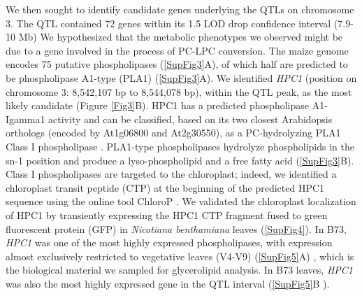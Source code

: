 \documentclass[9pt,twocolumn,twoside,lineno]{BioRxiv}
\begin{document}
We then sought to identify candidate genes underlying the QTLs on chromosome 3.
The QTL contained 72 genes within its 1.5 LOD drop confidence interval (7.9-10 Mb) 
We hypothesized that the metabolic phenotypes we observed might be due to a gene involved in the process of PC-LPC conversion.  
The maize genome encodes 75 putative phospholipases (\ref{SupFig3}A), of which half are predicted to be phospholipase A1-type (PLA1) (\ref{SupFig3}A).  
We identified \textit{HPC1} (position on chromosome 3: 8,542,107 bp to 8,544,078 bp), within the QTL peak, as the most likely candidate (Figure \ref{Fig3}B). 
HPC1 has a predicted phospholipase A1-Igamma1 activity and can be classified, based on its two closest Arabidopsis orthologs (encoded by At1g06800 and At2g30550), as a PC-hydrolyzing PLA1 Class I phospholipase \cite{Ryu2004-iv}. 
PLA1-type phospholipases hydrolyze phospholipids in the sn-1 position and produce a lyso-phospholipid and a free fatty acid (\ref{SupFig3}B). 
Class I phospholipases are targeted to the chloroplast; indeed, we identified a chloroplast transit peptide (CTP) at the beginning of the predicted HPC1 sequence using the online tool ChloroP \cite{Emanuelsson1999-rs}.
We validated the chloroplast localization of HPC1 by transiently expressing  the HPC1 CTP fragment fused to green fluorescent protein (GFP) in \textit{Nicotiana benthamiana} leaves (\ref{SupFig4}).
In B73, \textit{HPC1} was one of the most highly expressed phospholipases, with expression almost exclusively restricted to vegetative leaves (V4-V9) (\ref{SupFig5}A) \cite{Stelpflug2016-vr}, which is the biological material we sampled for glycerolipid analysis. 
In B73 leaves, \textit{HPC1} was also the most highly expressed gene in the QTL interval (\ref{SupFig5}B \cite{Stelpflug2016-vr}).
\end{document}
